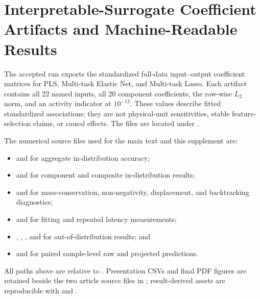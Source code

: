\documentclass[a4paper,10pt]{article}
\begin{document}
\section{Interpretable-Surrogate Coefficient Artifacts and Machine-Readable Results}

The accepted run exports the standardized full-data input--output coefficient matrices for PLS, Multi-task Elastic Net, and Multi-task Lasso. Each artifact contains all 22 named inputs, all 20 component coefficients, the row-wise $L_2$ norm, and an activity indicator at $10^{-12}$. These values describe fitted standardized associations; they are not physical-unit sensitivities, stable feature-selection claims, or causal effects. The files are located under .

The numerical source files used for the main text and this supplement are:
\begin{itemize}
\item {} and  for aggregate in-distribution accuracy;
\item {} and  for component and composite in-distribution results;
\item {} and  for mass-conservation, non-negativity, displacement, and backtracking diagnostics;
\item {} and  for fitting and repeated latency measurements;
\item {}, , , and  for out-of-distribution results; and
\item {} and  for paired sample-level raw and projected predictions.
\end{itemize}
All paths above are relative to . Presentation CSVs and final PDF figures are retained beside the two article source files in ; result-derived assets are reproducible with  and .
\end{document}
